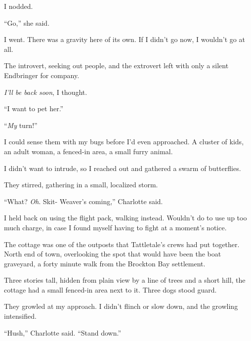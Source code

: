 I nodded.



``Go,'' she said.



I went.  There was a gravity here of its own.  If I didn't go now, I wouldn't go at all.



The introvert, seeking out people, and the extrovert left with only a silent Endbringer for company.



\emph{I'll be back soon}, I thought.



\sectionbreak



``I want to pet her.''



``\emph{My} turn!''



I could sense them with my bugs before I'd even approached.  A cluster of kids, an adult woman, a fenced-in area, a small furry animal.



I didn't want to intrude, so I reached out and gathered a swarm of butterflies.



They stirred, gathering in a small, localized storm.



``What?  \emph{Oh}.  Skit- Weaver's coming,'' Charlotte said.



I held back on using the flight pack, walking instead.  Wouldn't do to use up too much charge, in case I found myself having to fight at a moment's notice.



The cottage was one of the outposts that Tattletale's crews had put together.  North end of town, overlooking the spot that would have been the boat graveyard, a forty minute walk from the Brockton Bay settlement.



Three stories tall, hidden from plain view by a line of trees and a short hill, the cottage had a small fenced-in area next to it.  Three dogs stood guard.



They growled at my approach.  I didn't flinch or slow down, and the growling intensified.



``Hush,'' Charlotte said.  ``Stand down.''




